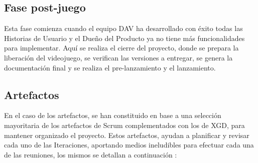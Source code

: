 \documentclass[a4paper, openright, 12pt]{report}
\begin{document}
\subsection*{Fase post-juego}
\justify
Esta fase comienza cuando el equipo DAV ha desarrollado con éxito todas las Historias de Usuario y el Dueño del Producto ya no tiene más funcionalidades para implementar. Aquí se realiza el cierre del proyecto, donde se prepara la liberación del videojuego, se verifican las versiones a entregar, se genera la documentación final y se realiza el pre-lanzamiento y el lanzamiento. \cite{Implementacion2011}

\subsection*{Artefactos}
\justify
En el caso de los artefactos, se han constituido en base a una selección mayoritaria de los artefactos de Scrum complementados con los de XGD, para mantener organizado el proyecto. Estos artefactos, ayudan a planificar y revisar cada uno de las Iteraciones, aportando medios ineludibles para efectuar cada una de las reuniones, los mismos se detallan a continuación \cite{Implementacion2011}:
\end{document}
